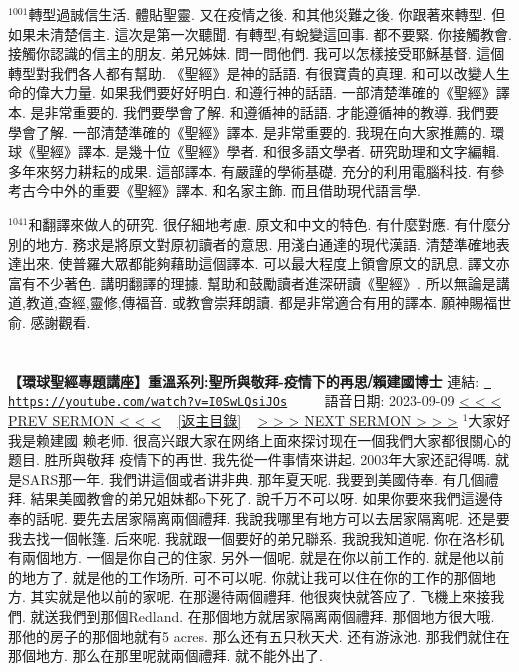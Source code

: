 \documentclass{book}
\begin{document}
$^{1001}$轉型過誠信生活.
體貼聖靈.
又在疫情之後.
和其他災難之後.
你跟著來轉型.
但如果未清楚信主.
這次是第一次聽聞.
有轉型,有蛻變這回事.
都不要緊.
你接觸教會.
接觸你認識的信主的朋友.
弟兄姊妹.
問一問他們.
我可以怎樣接受耶穌基督.
這個轉型對我們各人都有幫助.
《聖經》是神的話語.
有很寶貴的真理.
和可以改變人生命的偉大力量.
如果我們要好好明白.
和遵行神的話語.
一部清楚準確的《聖經》譯本.
是非常重要的.
我們要學會了解.
和遵循神的話語.
才能遵循神的教導.
我們要學會了解.
一部清楚準確的《聖經》譯本.
是非常重要的.
我現在向大家推薦的.
環球《聖經》譯本.
是幾十位《聖經》學者.
和很多語文學者.
研究助理和文字編輯.
多年來努力耕耘的成果.
這部譯本.
有嚴謹的學術基礎.
充分的利用電腦科技.
有參考古今中外的重要《聖經》譯本.
和名家主飾.
而且借助現代語言學.

$^{1041}$和翻譯來做人的研究.
很仔細地考慮.
原文和中文的特色.
有什麼對應.
有什麼分別的地方.
務求是將原文對原初讀者的意思.
用淺白通達的現代漢語.
清楚準確地表達出來.
使普羅大眾都能夠藉助這個譯本.
可以最大程度上領會原文的訊息.
譯文亦富有不少著色.
講明翻譯的理據.
幫助和鼓勵讀者進深研讀《聖經》.
所以無論是講道,教道,查經,靈修,傳福音.
或教會崇拜朗讀.
都是非常適合有用的譯本.
願神賜福世俞.
感謝觀看.
\newpage



\section{}
\label{sec:I0SwLQsiJOs}
\textbf{【環球聖經專題講座】重溫系列:聖所與敬拜-疫情下的再思⧸賴建國博士}
\newline
\newline
連結: \href{https://youtube.com/watch?v=I0SwLQsiJOs}{\texttt{ https://youtube.com/watch?v=I0SwLQsiJOs}} ~~~~ 語音日期: 2023-09-09 
\newline
\newline
\hyperref[sec:zm_TxjjjYm8]{\small{< < < PREV SERMON < < <}}
~
\hyperref[sec:index]{\small{[返主目錄]}}
~
\hyperref[sec:ECCsRtsc_50]{\small{> > > NEXT SERMON > > >}}
\newline
\newline
$^{1}$大家好 我是赖建國 赖老师.
很高兴跟大家在网络上面來探讨现在一個我們大家都很關心的题目.
胜所與敬拜 疫情下的再世.
我先從一件事情來讲起.
2003年大家还記得嗎.
就是SARS那一年.
我們讲這個或者讲非典.
那年夏天呢.
我要到美國侍奉.
有几個禮拜.
結果美國教會的弟兄姐妹都o下死了.
說千万不可以呀.
如果你要來我們這邊侍奉的話呢.
要先去居家隔离兩個禮拜.
我說我哪里有地方可以去居家隔离呢.
还是要我去找一個帐篷.
后來呢.
我就跟一個要好的弟兄聯系.
我說我知道呢.
你在洛杉矶有兩個地方.
一個是你自己的住家.
另外一個呢.
就是在你以前工作的.
就是他以前的地方了.
就是他的工作场所.
可不可以呢.
你就让我可以住在你的工作的那個地方.
其实就是他以前的家呢.
在那邊待兩個禮拜.
他很爽快就答应了.
飞機上來接我們.
就送我們到那個Redland.
在那個地方就居家隔离兩個禮拜.
那個地方很大哦.
那他的房子的那個地就有5 acres.
那么还有五只秋天犬.
还有游泳池.
那我們就住在那個地方.
那么在那里呢就兩個禮拜.
就不能外出了.
\end{document}
